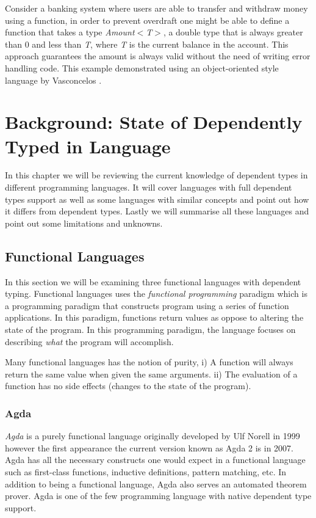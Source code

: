 \documentclass[a4paper,12pt]{report}
\begin{document}
\par
Consider a banking system where users are able to transfer and withdraw 
money using a function, 
in order to prevent overdraft one might be able to define a function that takes 
a type \textit{Amount$<$T$>$}, a double type that is always 
greater than 0 and less than \textit{T}, where \textit{T} is the current balance in the account. 
This approach guarantees the amount is always valid without the need of writing 
error handling code. This example demonstrated using an object-oriented style 
language by Vasconcelos \cite{objOritentedDependentType}.


\chapter{Background: State of Dependently Typed in Language} 
In this chapter we will be reviewing the current knowledge of dependent types 
in different programming languages. It will cover languages with full dependent 
types support as well as some languages with similar concepts and point out how 
it differs from dependent types. Lastly we will summarise all these languages 
and point out some limitations and unknowns. 

\section{Functional Languages}

In this section we will be examining three functional languages with 
dependent typing. Functional languages 
uses the \textit{functional programming} \cite{overviewFP} paradigm which is a programming 
paradigm that constructs program using a series of function applications. In 
this paradigm, functions return values as oppose to altering the state of the 
program. In this programming paradigm, the language focuses on describing 
\textit{what} the program will accomplish.

\par

Many functional languages has the notion of purity, i) A function will always 
return the same value when given the same arguments. ii) The evaluation of a 
function has no side effects (changes to the state of the program).

\subsection{Agda}

\textit{Agda} \cite{agda} is a purely functional language originally developed by Ulf Norell in 
1999 however the first appearance the current version known as Agda 2 is in 
2007. Agda has all the necessary constructs one would expect in a functional 
language such as first-class functions, inductive definitions, pattern matching, 
etc. In addition to being a functional language, Agda also serves an automated theorem prover. 
Agda is one of the few programming language with native dependent type support. 
\end{document}
